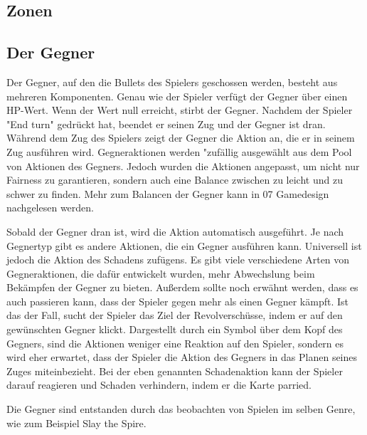 

\subsection{Zonen}\label{backpack_and_deck}

\subsection{Der Gegner}\label{der_gegner}
Der Gegner, auf den die Bullets des Spielers geschossen werden, besteht aus mehreren Komponenten.
Genau wie der Spieler verfügt der Gegner über einen HP-Wert. Wenn der Wert null erreicht, stirbt der Gegner.
Nachdem der Spieler "End turn" gedrückt hat, beendet er seinen Zug und der Gegner ist dran. Während dem Zug des Spielers
zeigt der Gegner die Aktion an, die er in seinem Zug ausführen wird.
Gegneraktionen werden "zufällig ausgewählt aus dem Pool von Aktionen des Gegners.
Jedoch wurden die Aktionen angepasst, um nicht nur Fairness zu garantieren,
sondern auch eine Balance zwischen zu leicht und zu schwer zu finden.
Mehr zum Balancen der Gegner kann in 07 Gamedesign nachgelesen werden.


Sobald der Gegner dran ist, wird die Aktion automatisch ausgeführt. Je nach Gegnertyp gibt es andere Aktionen,
die ein Gegner ausführen kann. Universell ist jedoch die Aktion des Schadens zufügens.
Es gibt viele verschiedene Arten von Gegneraktionen, die dafür entwickelt wurden, mehr Abwechslung beim Bekämpfen der Gegner zu bieten.
Außerdem sollte noch erwähnt werden, dass es auch passieren kann, dass der Spieler gegen mehr als einen Gegner kämpft.
Ist das der Fall, sucht der Spieler das Ziel der Revolverschüsse, indem er auf den gewünschten Gegner klickt.
Dargestellt durch ein Symbol über dem Kopf des Gegners, sind die Aktionen weniger eine Reaktion auf den Spieler,
sondern es wird eher erwartet, dass der Spieler die Aktion des Gegners in das Planen seines Zuges miteinbezieht.
Bei der eben genannten Schadenaktion kann der Spieler darauf reagieren und Schaden verhindern, indem er die Karte parried.

Die Gegner sind entstanden durch das beobachten von Spielen im selben Genre, wie zum Beispiel Slay the Spire. 

